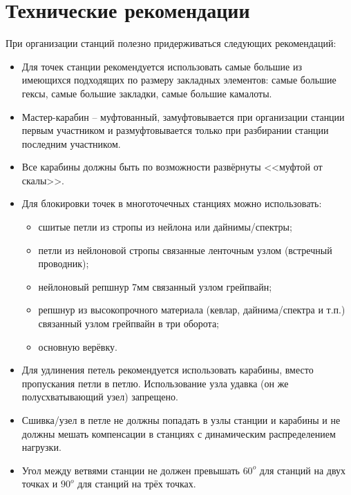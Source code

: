 \documentclass[fleqn, 12pt]{extarticle}
\begin{document}
\section{Технические рекомендации}\label{sec:advice}
    При организации станций полезно придерживаться следующих рекомендаций:
    \begin{itemize}
        \item Для точек станции рекомендуется использовать самые большие из имеющихся подходящих по размеру закладных элементов:
              самые большие гексы, самые большие закладки, самые большие камалоты.
        \item Мастер-карабин -- муфтованный, замуфтовывается при организации станции первым участником и размуфтовывается только при разбирании станции последним участником.
        \item Все карабины должны быть по возможности развёрнуты <<муфтой от скалы>>.
        \item Для блокировки точек в многоточечных станциях можно использовать:
            \begin{itemize}
                \item сшитые петли из стропы из нейлона или дайнимы/спектры;
                \item петли из нейлоновой стропы связанные ленточным узлом (встречный проводник);
                \item нейлоновый репшнур 7мм связанный узлом грейпвайн;
                \item репшнур из высокопрочного материала (кевлар, дайнима/спектра и т.п.) связанный узлом грейпвайн в три оборота;
                \item основную верёвку.
            \end{itemize}
        \item Для удлинения петель рекомендуется использовать карабины, вместо пропускания петли в петлю. Использование узла удавка (он же полусхватывающий узел) запрещено.
        \item Сшивка/узел в петле не должны попадать в узлы станции и карабины и не должны мешать компенсации в станциях с динамическим распределением нагрузки.
        \item Угол между ветвями станции не должен превышать $60^o$ для станций на двух точках и $90^o$ для станций на трёх точках.
    \end{itemize}
    
\nocite{*}


\end{document}
